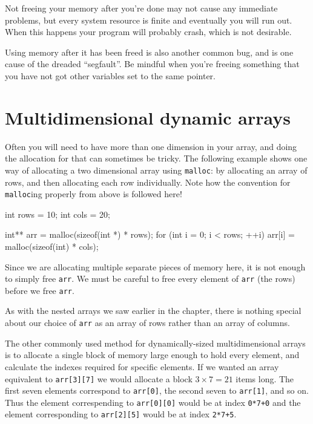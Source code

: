 Not freeing your memory after you're done may not cause any immediate problems, but every system resource is finite and eventually you will run out.
When this happens your program will probably crash, which is not desirable.

Using memory after it has been freed is also another common bug, and is one cause of the dreaded ``segfault''.
Be mindful when you're freeing something that you have not got other variables set to the same pointer.

\section{Multidimensional dynamic arrays}

Often you will need to have more than one dimension in your array, and doing the allocation for that can sometimes be tricky.
The following example shows one way of allocating a two dimensional array using \texttt{malloc}: by allocating an array of rows, and then allocating each row individually.
Note how the convention for \lstinline!malloc!ing properly from above is followed here! 

\begin{codeblock}
int rows = 10;
int cols = 20;

int** arr = malloc(sizeof(int *) * rows);
for (int i = 0; i < rows; ++i) {
    arr[i] = malloc(sizeof(int) * cols);
}
\end{codeblock}

Since we are allocating multiple separate pieces of memory here, it is not enough to simply free \lstinline!arr!.
We must be careful to free every element of \lstinline!arr! (the rows) before we free \lstinline!arr!.

As with the nested arrays we saw earlier in the chapter, there is nothing special about our choice of \lstinline!arr! as an array of rows rather than an array of columns.

The other commonly used method for dynamically-sized multidimensional arrays is to allocate a single block of memory large enough to hold every element, and calculate the indexes required for specific elements.
If we wanted an array equivalent to \lstinline!arr[3][7]! we would allocate a block $3 \times 7 = 21$ items long.
The first seven elements correspond to \lstinline!arr[0]!, the second seven to \lstinline!arr[1]!, and so on.
Thus the element correspending to \lstinline!arr[0][0]! would be at index \lstinline!0*7+0! and the element corresponding to \lstinline!arr[2][5]! would be at index \lstinline!2*7+5!.

